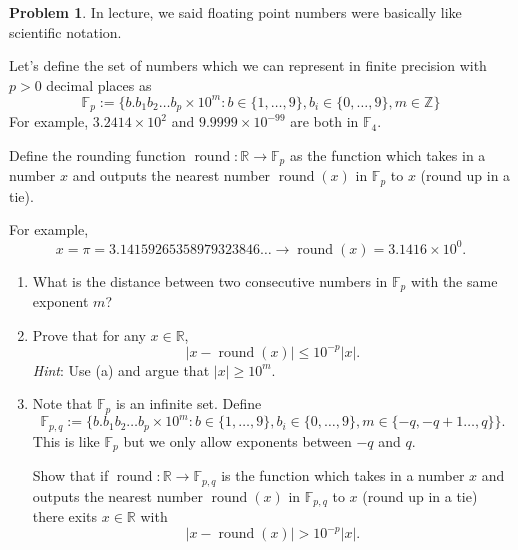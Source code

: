 \documentclass[12pt]{article}
\theoremstyle{definition}
\newtheorem{problem}{Problem}
\begin{document}
\begin{problem}
In lecture, we said floating point numbers were basically like scientific notation.

Let's define the set of numbers which we can represent in finite precision with $p>0$ decimal places as 
\[
\mathbb{F}_p := \big\{ b.b_1b_2\ldots b_p \times 10^{m} : b\in\{1,\dots, 9\}, b_i\in \{0,\ldots, 9\}, m\in\mathbb{Z} \big\} 
\]
For example, $3.2414\times 10^2$ and $9.9999 \times 10^{-99}$ are both in $\mathbb{F}_4$.


Define the rounding function $\operatorname{round} : \mathbb{R} \to \mathbb{F}_p$ as the function which takes in a number $x$ and outputs the nearest number $\operatorname{round}(x)$ in $\mathbb{F}_p$ to $x$ (round up in a tie).

For example, 
\[
x = \pi = 3.14159265358979323846\ldots \to \operatorname{round}(x) = 3.1416 \times 10^0.
\]

\begin{enumerate}
    \item What is the distance between two consecutive numbers in $\mathbb{F}_p$ with the same exponent $m$?
    \item Prove that for any $x\in\mathbb{R}$, 
    \[ 
        |x - \operatorname{round}(x) | \leq 10^{-p} |x|.
    \]
    \emph{Hint}: Use (a) and argue that $|x| \geq 10^{m}$. 
    
    \item Note that $\mathbb{F}_p$ is an infinite set. Define 
    \[
    \mathbb{F}_{p,q} := \big\{ b.b_1b_2\ldots b_p \times 10^{m} : b\in\{1,\dots, 9\}, b_i\in \{0,\ldots, 9\}, m\in\{-q,-q+1 \ldots, q\} \big\}.
    \]
    This is like $\mathbb{F}_p$ but we only allow exponents between $-q$ and $q$.

    Show that if $\operatorname{round} : \mathbb{R} \to \mathbb{F}_{p,q}$ is the function which takes in a number $x$ and outputs the nearest number $\operatorname{round}(x)$ in $\mathbb{F}_{p,q}$ to $x$ (round up in a tie) there exits $x\in\mathbb{R}$ with
    \[ 
        |x - \operatorname{round}(x) | > 10^{-p} |x|.
    \]
    
    
\end{enumerate}

\end{problem}
\end{document}
